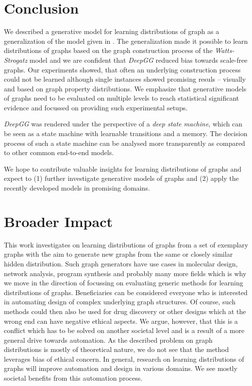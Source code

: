 \documentclass{article}
\begin{document}
 \section{Conclusion}\label{sec:conclusion}
We described a generative model for learning distributions of graph as a generalization of the model given in \cite{li2018learning}.
The generalization made it possible to learn distributions of graphs based on the graph construction process of the \textit{Watts-Strogatz} model and we are confident that \textit{DeepGG} reduced bias towards scale-free graphs.
Our experiments showed, that often an underlying construction process could not be learned although single instances showed promising resuls -- visually and based on graph property distributions.
We emphasize that generative models of graphs need to be evaluated on multiple levels to reach statistical significant evidence and focussed on providing such experimental setups.

\textit{DeepGG} was rendered under the perspective of a \textit{deep state machine}, which can be seen as a state machine with learnable transitions and a memory.
The decision process of such a state machine can be analysed more transparently as compared to other common end-to-end models.

We hope to contribute valuable insights for learning distributions of graphs and expect to (1) further investigate generative models of graphs and (2) apply the recently developed models in promising domains.
  
\section*{Broader Impact}

This work investigates on learning distributions of graphs from a set of exemplary graphs with the aim to generate new graphs from the same or closely similar hidden distribution.
Such graph generators have use cases in molecular design, network analysis, program synthesis and probably many more fields which is why we move in the direction of focussing on evaluating generic methods for learning distributions of graphs.
Beneficiaries can be considered everyone who is interested in automating design of complex underlying graph structures.
Of course, such methods could then also be used for drug discovery or other designs which at the wrong end can have negative ethical aspects.
We argue, however, that this is a conflict which has to be solved on another societal level and is a result of a more general drive towards automation.
As the described problem on graph distributions is mostly of theoretical nature, we do not see that the method leverages bias of ethical concern.
In general, research on learning distributions of graphs will improve automation and design in various domains.
We see mostly societal benefits from this automation process.
\end{document}
